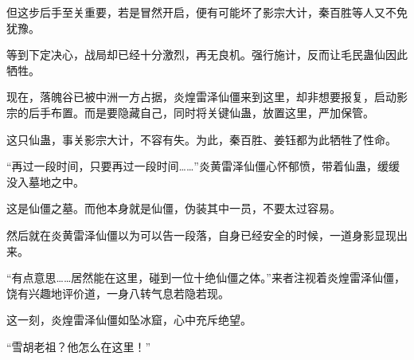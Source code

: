 \begin{this_body}
但这步后手至关重要，若是冒然开启，便有可能坏了影宗大计，秦百胜等人又不免犹豫。

等到下定决心，战局却已经十分激烈，再无良机。强行施计，反而让毛民蛊仙因此牺牲。

现在，落魄谷已被中洲一方占据，炎煌雷泽仙僵来到这里，却非想要报复，启动影宗的后手布置。而是要隐藏自己，同时将关键仙蛊，放置这里，严加保管。

这只仙蛊，事关影宗大计，不容有失。为此，秦百胜、姜钰都为此牺牲了性命。

“再过一段时间，只要再过一段时间……”炎黄雷泽仙僵心怀郁愤，带着仙蛊，缓缓没入墓地之中。

这是仙僵之墓。而他本身就是仙僵，伪装其中一员，不要太过容易。

然后就在炎黄雷泽仙僵以为可以告一段落，自身已经安全的时候，一道身影显现出来。

“有点意思……居然能在这里，碰到一位十绝仙僵之体。”来者注视着炎煌雷泽仙僵，饶有兴趣地评价道，一身八转气息若隐若现。

这一刻，炎煌雷泽仙僵如坠冰窟，心中充斥绝望。

“雪胡老祖？他怎么在这里！”

\end{this_body}

